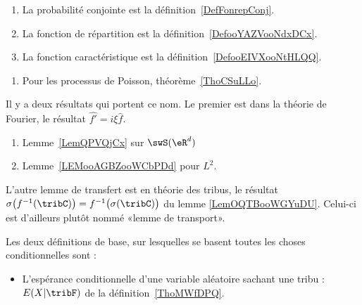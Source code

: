 \begin{enumerate}
    \item
        La probabilité conjointe est la définition~\ref{DefFonrepConj}.
    \item
        La fonction de répartition est la définition~\ref{DefooYAZVooNdxDCx}.
    \item
        La fonction caractéristique est la définition~\ref{DefooEIVXooNtHLQQ}.
\end{enumerate}


\begin{enumerate}
    \item
        Pour les processus de Poisson, théorème~\ref{ThoCSuLLo}.
\end{enumerate}

      \label{THEMEooJREIooKEdMOl}

Il y a deux résultats qui portent ce nom. Le premier est dans la théorie de Fourier, le résultat \( \hat{f'}=i\xi \hat{f}\).
\begin{enumerate}
    \item
        Lemme~\ref{LemQPVQjCx} sur \( \swS(\eR^d)\)
    \item
        Lemme~\ref{LEMooAGBZooWCbPDd} pour \( L^2\).
\end{enumerate}

L'autre lemme de transfert est en théorie des tribus, le résultat $\sigma\big( f^{-1}(\tribC) \big)=f^{-1}\big( \sigma(\tribC) \big)$ du lemme \ref{LemOQTBooWGYuDU}. Celui-ci est d'ailleurs plutôt nommé «lemme de transport».



    Les deux définitions de base, sur lesquelles se basent toutes les choses conditionnelles sont :
    \begin{itemize}
        \item L'espérance conditionnelle d'une variable aléatoire sachant une tribu : \( E(X|\tribF)\) de la définition~\ref{ThoMWfDPQ}.
    \end{itemize}

